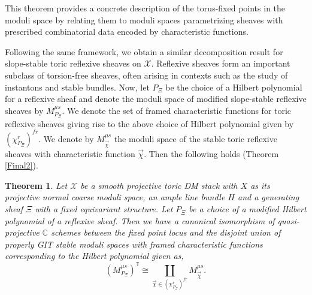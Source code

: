 \documentclass[10pt]{amsart}
\newtheorem{thm}[prop]{Theorem}
\newcommand{\sX}{{\mathcal X}}
\numberwithin{equation}{subsection}
\begin{document}
This theorem provides a concrete description of the torus-fixed points in the moduli space by relating them to moduli spaces parametrizing sheaves with prescribed combinatorial data encoded by characteristic functions.

Following the same framework, we obtain a similar decomposition result for slope-stable toric reflexive sheaves on $\sX$. Reflexive sheaves form an important subclass of torsion-free sheaves, often arising in contexts such as the study of instantons and stable bundles. Now, let $P_{\Xi}$ be the choice of a Hilbert polynomial for a reflexive sheaf and denote the moduli space of modified slope-stable reflexive sheaves by $M^{\mu s}_{P_{\Xi}}$. We denote the set of framed characteristic functions for toric reflexive sheaves giving rise to the above choice of Hilbert polynomial given by $(\chi^r_{P_{\Xi}})^{fr}$. We denote by $M^{\mu s}_{\vec\chi}$ the moduli space of the stable toric reflexive sheaves with characteristic function $\vec\chi.$ Then the following holds (Theorem \ref{Final2}).
\begin{thm}
Let $\sX$ be a smooth projective toric DM stack with $X$ as its projective normal coarse moduli space, an ample line bundle $H$ and a generating sheaf $\Xi$ with a fixed equivariant structure. Let $P_{\Xi}$ be a choice of a modified Hilbert polynomial of a reflexive sheaf. Then we have a canonical isomorphism of quasi-projective $\mathbb C$ schemes between the fixed point locus and the disjoint union of properly GIT stable moduli spaces with framed characteristic functions corresponding to the Hilbert polynomial given as,
$$(M^{\mu s}_{P_{\Xi}})^{\mathbb T} \cong \coprod \limits_{\vec\chi\in (\chi^r_{P_{\Xi}})^{fr}}M^{\mu s}_{\vec\chi}.$$
\end{thm}

\end{document}

